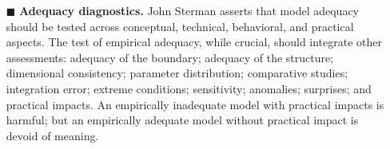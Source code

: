 \documentclass[./main_en.tex]{subfiles}
\begin{document}
\begin{itemize}
    \item[$\blacksquare$] \textbf{Adequacy diagnostics.} John Sterman asserts that model adequacy should be tested across conceptual, technical, behavioral, and practical aspects. The test of empirical adequacy, while crucial, should integrate other assessments: adequacy of the boundary; adequacy of the structure; dimensional consistency; parameter distribution; comparative studies; integration error; extreme conditions; sensitivity; anomalies; surprises; and practical impacts. An empirically inadequate model with practical impacts is harmful; but an empirically adequate model without practical impact is devoid of meaning.
\end{itemize}
\end{document}

